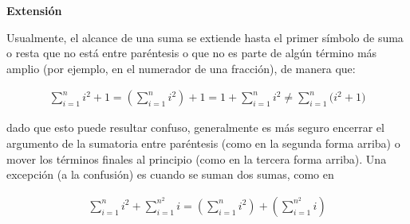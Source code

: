 \textbf{Extensión}

Usualmente, el alcance de una suma se extiende hasta el primer símbolo de suma o resta que no está entre paréntesis o que no es parte de algún término más amplio (por ejemplo, en el numerador de una fracción), de manera que:

\begin{align*}
  \sum_{i=1}^{n} i^2 + 1 = \left(\sum_{i=1}^{n}i^2\right) + 1 = 1 + \sum_{i=1}^{n} i^2 \neq \sum_{i=1}^{n} \bigl(i^2+1\bigr)
\end{align*}

dado que esto puede resultar confuso, generalmente es más seguro encerrar el argumento de la sumatoria entre paréntesis (como en la segunda forma arriba) o mover los términos finales al principio (como en la tercera forma arriba). Una excepción (a la confusión) es cuando se suman dos sumas, como en

\begin{align*}
  \sum_{i=1}^{n} i^2 + \sum_{i=1}^{n^2} i = \left(\sum_{i=1}^{n}i^2\right) + \left(\sum_{i=1}^{n^2}i\right)
\end{align*}
